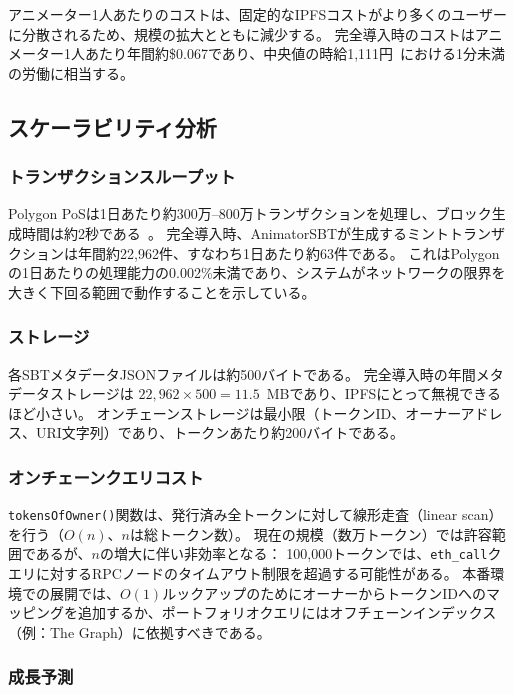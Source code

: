 アニメーター1人あたりのコストは、固定的なIPFSコストがより多くのユーザーに分散されるため、規模の拡大とともに減少する。
完全導入時のコストはアニメーター1人あたり年間約\$0.067であり、中央値の時給1{,}111円~\cite{nafca2024labor}における1分未満の労働に相当する。

\subsection{スケーラビリティ分析}
\label{subsec:scalability}

\subsubsection{トランザクションスループット}

Polygon PoSは1日あたり約300万--800万トランザクションを処理し、ブロック生成時間は約2秒である~\cite{gangwal2023layer2}。
完全導入時、AnimatorSBTが生成するミントトランザクションは年間約22{,}962件、すなわち1日あたり約63件である。
これはPolygonの1日あたりの処理能力の0.002\%未満であり、システムがネットワークの限界を大きく下回る範囲で動作することを示している。

\subsubsection{ストレージ}

各SBTメタデータJSONファイルは約500バイトである。
完全導入時の年間メタデータストレージは
$22{,}962 \times 500 = 11.5$~MBであり、IPFSにとって無視できるほど小さい。
オンチェーンストレージは最小限（トークンID、オーナーアドレス、URI文字列）であり、トークンあたり約200バイトである。

\subsubsection{オンチェーンクエリコスト}

\texttt{tokensOfOwner()}関数は、発行済み全トークンに対して線形走査（linear scan）を行う（$O(n)$、$n$は総トークン数）。
現在の規模（数万トークン）では許容範囲であるが、$n$の増大に伴い非効率となる：
100{,}000トークンでは、\texttt{eth\_call}クエリに対するRPCノードのタイムアウト制限を超過する可能性がある。
本番環境での展開では、$O(1)$ルックアップのためにオーナーからトークンIDへのマッピングを追加するか、ポートフォリオクエリにはオフチェーンインデックス（例：The Graph）に依拠すべきである。

\subsubsection{成長予測}

